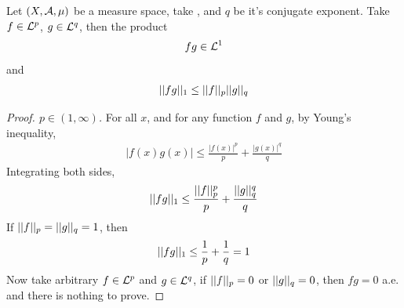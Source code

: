 \documentclass[11pt]{article}
\begin{document}
	\begin{theorem}
		Let $(X, \mathcal{{A}}, \mu)$ be a measure space, take , and $q$ be it's conjugate exponent. Take $f \in \mathcal{{L}}^p$, $g \in \mathcal{{L}}^q$, then the product
		\begin{align}
			fg \in \mathcal{{L}}^1
		\end{align}
		and
		\begin{align}
			\vert \vert {fg} \vert \vert_1 \leq \vert \vert {f} \vert \vert_p \vert \vert {g} \vert \vert_q
		\end{align}
		\begin{proof}[Proof. $p \in (1, \infty)$]
			For all $x$, and for any function $f$ and $g$, by Young's inequality,
			\begin{align}
				|f(x) g(x)| \leq \frac{|f(x)|^p}{p} + \frac{|g(x)|^q}{q}
			\end{align}
			Integrating both sides,
			\begin{align}
				\vert \vert {f g} \vert \vert_1 \leq \frac{\vert \vert {f} \vert \vert_p^p}{p} + \frac{\vert \vert {g} \vert \vert_q^q}{q}
			\end{align}
			If $\vert \vert {f} \vert \vert_p = \vert \vert {g} \vert \vert_q = 1$, then
			\begin{align}
				\vert \vert {fg} \vert \vert_1 \leq \frac{1}{p} + \frac{1}{q} = 1 \label{eq:2}
			\end{align}
			Now take arbitrary $f \in \mathcal{{L}}^p$ and $g \in \mathcal{{L}}^q$, if $\vert \vert {f} \vert \vert_p = 0$ or $\vert \vert {g} \vert \vert_q = 0$, then $fg = 0$ a.e. and there is nothing to prove.
			

\end{proof}
\end{theorem}
\end{document}
